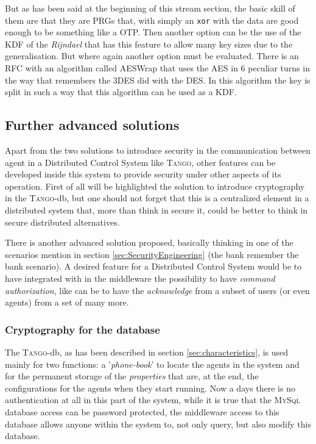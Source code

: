 \documentclass[10pt,a4paper,twoside]{llncs}
\newcommand{\todo}[1]{\texttt{\color{red}TODO:} ``\emph{#1}''}
\newcommand{\tango}{\textsc{Tango}}
\newcommand{\mysql}{\textsc{MySql}}
\begin{document}
But as has been said at the beginning of this stream section, the basic skill of them are that they are PRGs that, with simply an {\tt xor} with the data are good enough to be something like a OTP. Then another option can be the use of the KDF of the \emph{Rijndael} that has this feature to allow many key sizes due to the generalisation. But where again another option must be evaluated. There is an RFC \cite{rfc3394} with an algorithm called AESWrap that uses the AES in 6 peculiar turns in the way that remembers the 3DES did with the DES. In this algorithm the key is split in such a way that this algorithm can be used as a KDF.


\subsection{Further advanced solutions}\label{sec:advancedSolutions}

Apart from the two solutions to introduce security in the communication between agent in a Distributed Control System like \tango, other features can be developed inside this system to provide security under other aspects of its operation. First of all will be highlighted the solution to introduce cryptography in the \tango-db, but one should not forget that this is a centralized element in a distributed system that, more than think in secure it, could be better to think in secure distributed alternatives.

There is another advanced solution proposed, basically thinking in one of the scenarios mention in section \ref{sec:SecurityEngineering} (the bank remember the bank scenario). A desired feature for a Distributed Control System would be to have integrated with in the middleware the possibility to have \emph{command authorization}, like can be to have the \emph{acknowledge} from a subset of users (or even agents) from a set of many more.

\subsubsection{Cryptography for the database}\label{sec:Database}

The \tango-db, as has been described in section \ref{sec:characteristics}, is used mainly for two functions: a '\emph{phone-book}' to locate the agents in the system and for the permanent storage of the \emph{properties} that are, at the end, the configurations for the agents when they start running. Now a days there is no authentication at all in this part of the system, while it is true that the \mysql\, database access can be password protected, the middleware access to this database allows anyone within the system to, not only query, but also modify this database.
\end{document}
